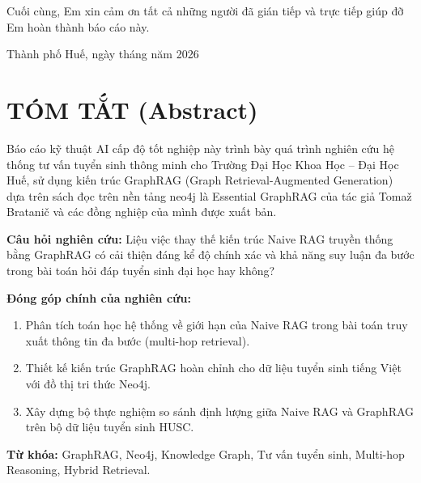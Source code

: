 \documentclass[12pt,a4paper]{report}
\theoremstyle{plain}
\theoremstyle{definition}
\begin{document}
	Cuối cùng, Em xin cảm ơn tất cả những người đã gián tiếp và trực tiếp giúp đỡ
	Em hoàn thành báo cáo này.
	
	\vspace{2cm}
	
	\begin{flushright}
		Thành phố Huế, ngày \quad tháng \quad năm 2026
	\end{flushright}
	
	\clearpage
	
	
	\thispagestyle{empty}
	\vspace*{3cm}
	
	\section*{TÓM TẮT (Abstract)}
	
	\vspace{1cm}
	
	Báo cáo kỹ thuật AI cấp độ tốt nghiệp này trình bày quá trình nghiên cứu hệ
	thống tư vấn tuyển sinh thông minh cho Trường Đại Học Khoa Học -- Đại Học Huế,
	sử dụng kiến trúc GraphRAG (Graph Retrieval-Augmented Generation) dựa trên
	sách đọc trên nền tảng neo4j là Essential GraphRAG của tác giả Tomaž Bratanič
	và các đồng nghiệp của mình được xuất bản.
	
	\textbf{Câu hỏi nghiên cứu:} Liệu việc thay thế kiến trúc Naive RAG truyền
	thống bằng GraphRAG có cải thiện đáng kể độ chính xác và khả năng suy luận
	đa bước trong bài toán hỏi đáp tuyển sinh đại học hay không?
	
	\textbf{Đóng góp chính của nghiên cứu:}
	\begin{enumerate}
		\item Phân tích toán học hệ thống về giới hạn của Naive RAG trong bài toán
		truy xuất thông tin đa bước (multi-hop retrieval).
		\item Thiết kế kiến trúc GraphRAG hoàn chỉnh cho dữ liệu tuyển sinh tiếng
		Việt với đồ thị tri thức Neo4j.
		\item Xây dựng bộ thực nghiệm so sánh định lượng giữa Naive RAG và GraphRAG
		trên bộ dữ liệu tuyển sinh HUSC.
	\end{enumerate}
	
	\textbf{Từ khóa:} GraphRAG, Neo4j, Knowledge Graph, Tư vấn tuyển sinh,
	Multi-hop Reasoning, Hybrid Retrieval.
	
\end{document}
